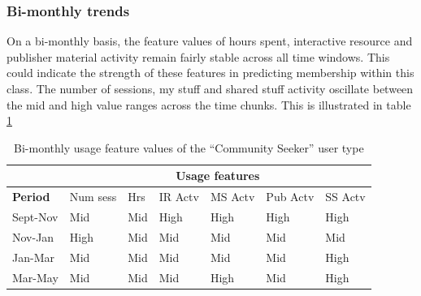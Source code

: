 \documentclass{acm_proc_article-sp}
\begin{document}
\subsubsection{Bi-monthly trends}
On a bi-monthly basis, the feature values of hours spent, interactive resource and publisher material activity remain fairly stable across all time windows. This could indicate the strength of these features in predicting membership within this class. The number of sessions, my stuff and shared stuff activity oscillate between the mid and high value ranges across the time chunks. This is illustrated in table \ref{cluster2bimonthly} 
\begin{table}
\caption{Bi-monthly usage feature values of the ``Community Seeker'' user type}
\label{cluster2bimonthly}
\begin{tabular}{|p{1.5cm}|p{0.6cm}|p{0.6cm}|p{0.6cm}|p{0.6cm}|p{0.8cm}|p{0.8cm}|}
\hline
& \multicolumn{6}{c|}{\textbf{Usage features}}  \\ \hline
 \textbf{Period} 
 & Num sess & Hrs & IR Actv & MS Actv & Pub Actv & SS Actv \\ \hline
Sept-Nov & Mid & Mid  & High & High & High & High \\ \hline
Nov-Jan & High & Mid  & Mid & Mid & Mid & Mid \\ \hline
Jan-Mar & Mid & Mid  & Mid & Mid & Mid & High \\ \hline
Mar-May & Mid & Mid  & Mid & High & Mid & High \\ \hline
\end{tabular}
\end{table}
\end{document}
